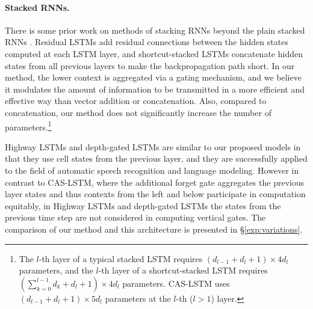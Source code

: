 \documentclass[wcp]{jmlr}
\begin{document}
    \paragraph{Stacked RNNs.}
    There is some prior work on methods of stacking RNNs beyond the plain stacked RNNs \citep{schmidhuber1992learning,el1996hierarchical}.
    Residual LSTMs \citep{kim2017residual,tran2017stack} add residual connections between the hidden states computed at each LSTM layer, and shortcut-stacked LSTMs \citep{nie2017shortcut} concatenate hidden states from all previous layers to make the backpropagation path short.
    In our method, the lower context is aggregated via a gating mechanism, and we believe it modulates the amount of information to be transmitted in a more efficient and effective way than vector addition or concatenation.
    Also, compared to concatenation, our method does not significantly increase the number of parameters.\footnote{The $l$-th layer of a typical stacked LSTM requires $(d_{l-1} + d_l + 1) \times 4d_l$ parameters, and the $l$-th layer of a shortcut-stacked LSTM requires $(\sum_{k=0}^{l-1} {d_k} + d_l + 1) \times 4d_l$ parameters. CAS-LSTM uses $(d_{l-1} + d_l + 1) \times 5d_l$ parameters at the $l$-th ($l>1$) layer.}
    
    Highway LSTMs \citep{zhang2016highway} and depth-gated LSTMs \citep{yao2015depth} are similar to our proposed models in that they use cell states from the previous layer, and they are successfully applied to the field of automatic speech recognition and language modeling.
    However in contrast to CAS-LSTM, where the additional forget gate aggregates the previous layer states and thus contexts from the left and below participate in computation equitably, in Highway LSTMs and depth-gated LSTMs the states from the previous time step are not considered in computing vertical gates.
    The comparison of our method and this architecture is presented in \S\ref{exp:variations}.
    
\end{document}
